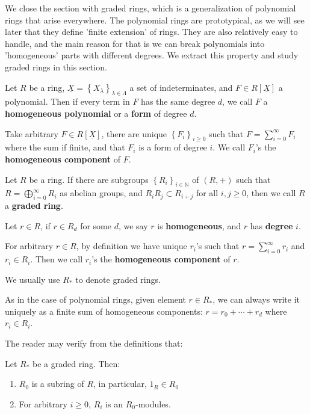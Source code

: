 \documentclass{note-eng}
\begin{document}
We close the section with graded rings, which is a generalization of polynomial rings that arise everywhere. The polynomial rings are prototypical, as we will see later that they define 'finite extension' of rings. They are also relatively easy to handle, and the main reason for that is we can break polynomials into 'homogeneous' parts with different degrees. We extract this property and study graded rings in this section.

\begin{definition}
    Let $R$ be a ring, $\underline{X} = \left\lbrace X_\lambda \right\rbrace_{\lambda \in \Lambda}$ a set of indeterminates, and $F \in R[\underline{X}]$ a polynomial. Then if every term in $F$ has the same degree $d$, we call $F$ a \textbf{homogeneous polynomial} or a \textbf{form} of degree $d$.

    Take arbitrary $F \in R[\underline{X}]$, there are unique $\left\lbrace F_i \right\rbrace_{i \ge 0}$ such that $F = \sum\limits_{i = 0}^{\infty} F_i$ where the sum if finite, and that $F_i$ is a form of degree $i$. We call $F_i$'s the \textbf{homogeneous component} of $F$.
\end{definition}

\begin{definition}
    Let $R$ be a ring. If there are subgroups $\left\lbrace R_i \right\rbrace_{i \in \mathbb{N}}$ of $(R, +)$ such that $R = \bigoplus\limits_{i = 0}^{\infty} R_i$ as abelian groups, and $R_iR_j \subset R_{i + j}$ for all $i, j \ge 0$, then we call $R$ a \textbf{graded ring}.
    
    Let $r \in R$, if $r \in R_d$ for some $d$, we say $r$ is \textbf{homogeneous}, and $r$ has \textbf{degree} $i$.

    For arbitrary $r \in R$, by definition we have unique $r_i$'s such that $r = \sum\limits_{i = 0}^{\infty} r_i$ and $r_i \in R_i$. Then we call $r_i$'s the \textbf{homogeneous component} of $r$.

    We usually use $R_{\ast}$ to denote graded rings.
\end{definition}

As in the case of polynomial rings, given element $r \in R_\ast$, we can always write it uniquely as a finite sum of homogeneous components: $r = r_0 + \cdots + r_d$ where $r_i \in R_i$.

The reader may verify from the definitions that:

\begin{proposition}
    Let $R_{\ast}$ be a graded ring. Then:
    \begin{enumerate}
        \item $R_0$ is a subring of $R$, in particular, $1_R \in R_0$
        \item For arbitrary $i \ge 0$, $R_i$ is an $R_0$-modules.
    \end{enumerate}
\end{proposition}
\end{document}
